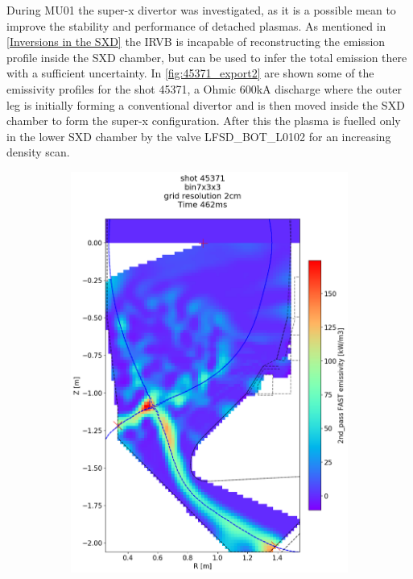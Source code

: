 During MU01 the super-x divertor was investigated, as it is a possible mean to improve the stability and performance of detached plasmas. As mentioned in \autoref{Inversions in the SXD} the IRVB is incapable of reconstructing the emission profile inside the SXD chamber, but can be used to infer the total emission there with a sufficient uncertainty. In \autoref{fig:45371_export2} are shown some of the emissivity profiles for the shot 45371, a Ohmic 600kA discharge where the outer leg is initially forming a conventional divertor and is then moved inside the SXD chamber to form the super-x configuration. After this the plasma is fuelled only in the lower SXD chamber by the valve LFSD\_BOT\_L0102 for an increasing density scan.
\begin{figure}
     \centering
     \begin{subfigure}{0.395\linewidth}
         \centering
         \includegraphics[trim={75 40 0 190},clip,width=\textwidth]{Chapters/chapter2/figs/IRVB-MASTU_shot-45371_export_7.png}

\end{subfigure}
\end{figure}
